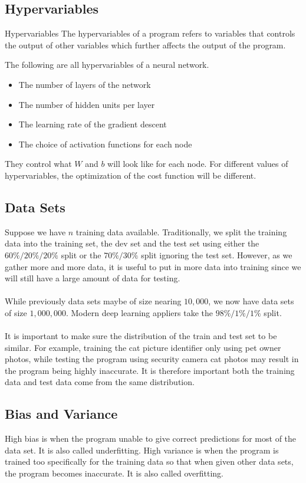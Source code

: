 \documentclass[a4paper]{article}
\begin{document}
\begin{enumerate}
\subsection{Hypervariables}
\begin{defn}{Hypervariables}{} The hypervariables of a program refers to variables that controls the output of other variables which further affects the output of the program. 
\end{defn}

The following are all hypervariables of a neural network. 
\begin{itemize}
\item The number of layers of the network
\item The number of hidden units per layer
\item The learning rate of the gradient descent
\item The choice of activation functions for each node
\end{itemize}
They control what $W$ and $b$ will look like for each node. For different values of hypervariables, the optimization of the cost function will be different. 

\subsection{Data Sets}
Suppose we have $n$ training data available. Traditionally, we split the training data into the training set, the dev set and the test set using either the $60\%/20\%/20\%$ split or the $70\%/30\%$ split ignoring the test set. However, as we gather more and more data, it is useful to put in more data into training since we will still have a large amount of data for testing. \\~\\
While previously data sets maybe of size nearing $10,000$, we now have data sets of size $1,000,000$. Modern deep learning appliers take the $98\%/1\%/1\%$ split. \\~\\
It is important to make sure the distribution of the train and test set to be similar. For example, training the cat picture identifier only using pet owner photos, while testing the program using security camera cat photos may result in the program being highly inaccurate. It is therefore important both the training data and test data come from the same distribution. 

\subsection{Bias and Variance}
High bias is when the program unable to give correct predictions for most of the data set. It is also called underfitting. High variance is when the program is trained too specifically for the training data so that when given other data sets, the program becomes inaccurate. It is also called overfitting. \\~\\


\end{enumerate}
\end{document}
